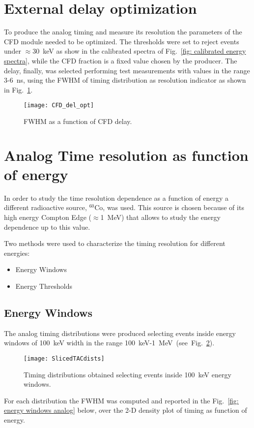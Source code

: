 \section*{External delay optimization}
To produce the analog timing and measure its resolution the parameters of the CFD module needed to be optimized. The thresholds were set to reject events under $\approx$30~keV as show in the calibrated spectra of  Fig.~\ref{fig: calibrated energy spectra}, while the CFD fraction is a fixed value chosen by the producer. The delay, finally, was selected performing test measurements with values in the range 3-6~ns, using the FWHM of timing distribution as resolution indicator as shown in Fig.~\ref{Fig:CFD_Delay}.
\begin{figure}[h!]
	\centering
	\texttt{[image: CFD\_del\_opt]}
	\caption{FWHM as a function of CFD delay.}
	\label{Fig:CFD_Delay}
\end{figure}
\section*{Analog Time resolution as function of energy}
In order to study the time resolution dependence as a function of energy a different radioactive source, $^{60}$Co, was used. This source is chosen because of its high energy Compton Edge ($\approx$1~MeV) that allows to study the energy dependence up to this value. 

Two methods were used to characterize the  timing resolution for different energies: 
\begin{itemize}
	\item Energy Windows
	\item Energy Thresholds
\end{itemize} 

\subsection*{Energy Windows}
 The analog timing distributions were produced selecting events inside energy windows of 100~keV width in the range 100~keV-1~MeV~(see~Fig.~\ref{Fig:Energy_slice}). 
\begin{figure}[h!]
	\centering
	\texttt{[image: SlicedTACdists]}
	\caption{Timing distributions obtained selecting events inside 100~keV energy windows.}
	\label{Fig:Energy_slice}
\end{figure}

For each distribution the FWHM was computed and reported in the Fig.~\ref{fig: energy windows analog} below, over the 2-D density plot of timing as function of energy.

